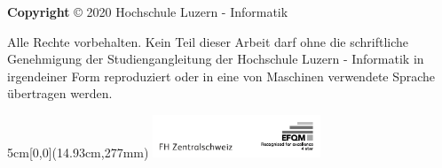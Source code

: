 \vspace{1em}

\noindent
\textbf{Copyright} © 2020 Hochschule Luzern - Informatik

\vspace{1em}
\noindent
Alle Rechte vorbehalten. Kein Teil dieser Arbeit darf ohne die schriftliche Genehmigung der Studiengangleitung der Hochschule Luzern - Informatik in irgendeiner Form reproduziert oder in eine von Maschinen verwendete Sprache übertragen werden.


\begin{textblock*}{5cm}[0,0](14.93cm,277mm)
	\includegraphics[keepaspectratio,width=5cm]{img/FHZ_Logo}
\end{textblock*}
